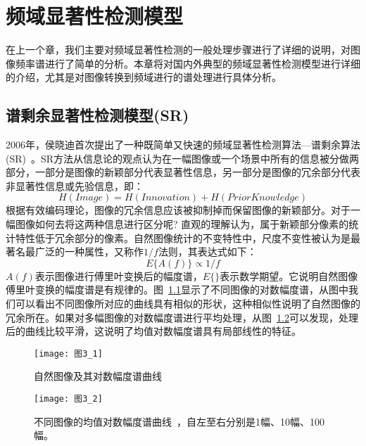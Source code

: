 \chapter{频域显著性检测模型}
\label{cha3}

在上一个章，我们主要对频域显著性检测的一般处理步骤进行了详细的说明，对图像频率谱进行了简单的分析。本章将对国内外典型的频域显著性检测模型进行详细的介绍，尤其是对图像转换到频域进行的谱处理进行具体分析。
\section{谱剩余显著性检测模型(SR)}
\label{3_1}

2006年，侯晓迪首次提出了一种既简单又快速的频域显著性检测算法---谱剩余算法(SR)~\cite{HouXiaodiCVPR2007Residual}。SR方法从信息论\cite{Barlow1961Possible}的观点认为在一幅图像或一个场景中所有的信息被分做两部分，一部分是图像的新颖部分代表显著性信息，另一部分是图像的冗余部分代表非显著性信息或先验信息，即：
\begin{equation}
H(Image)=H(Innovation)+H(Prior Knowledge)
\label{式3_1}
\end{equation}
根据有效编码理论，图像的冗余信息应该被抑制掉而保留图像的新颖部分。对于一幅图像如何去将这两种信息进行区分呢? 直观的理解认为，属于新颖部分像素的统计特性低于冗余部分的像素。自然图像统计的不变特性中，尺度不变性\cite{Ruderman1994Statistics,Srivastava2003Advances}被认为是最著名最广泛的一种属性，又称作$1/f$法则，其表达式如下：
\begin{equation}
E\{A(f)\}\propto 1/f
\label{式3_2}
\end{equation}
$A(f)$表示图像进行傅里叶变换后的幅度谱，$E\{\}$表示数学期望。它说明自然图像傅里叶变换的幅度谱是有规律的。图~\ref{图3_1}显示了不同图像的对数幅度谱，从图中我们可以看出不同图像所对应的曲线具有相似的形状，这种相似性说明了自然图像的冗余所在。如果对多幅图像的对数幅度谱进行平均处理，从图~\ref{图3_2}可以发现，处理后的曲线比较平滑，这说明了均值对数幅度谱具有局部线性的特征\cite{HouXiaodiCVPR2007Residual}。
\begin{figure}[!t] %
\centering
\texttt{[image: 图3\_1]}
\caption{自然图像及其对数幅度谱曲线~\cite{HouXiaodiCVPR2007Residual}}
\label{图3_1}
\end{figure}
\begin{figure}[!t] %
\centering
\texttt{[image: 图3\_2]}
\caption{不同图像的均值对数幅度谱曲线~\cite{HouXiaodiCVPR2007Residual}，自左至右分别是1幅、10幅、100幅。}
\label{图3_2}
\end{figure}

